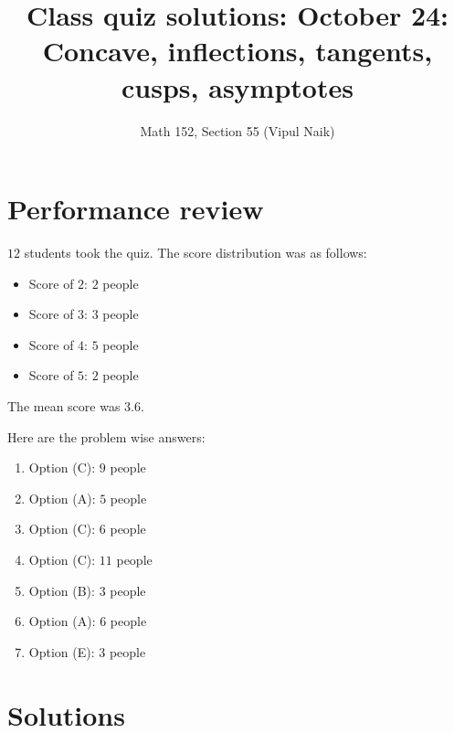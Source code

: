\documentclass[10pt]{amsart}
\title{Class quiz solutions: October 24: Concave, inflections, tangents, cusps, asymptotes}
\author{Math 152, Section 55 (Vipul Naik)}
\begin{document}
\maketitle

\section{Performance review}

$12$ students took the quiz. The score distribution was as follows:

\begin{itemize}
\item Score of $2$: $2$ people
\item Score of $3$: $3$ people
\item Score of $4$: $5$ people
\item Score of $5$: $2$ people
\end{itemize}

The mean score was $3.6$.

Here are the problem wise answers:

\begin{enumerate}
\item Option (C): $9$ people
\item Option (A): $5$ people
\item Option (C): $6$ people
\item Option (C): $11$ people
\item Option (B): $3$ people
\item Option (A): $6$ people
\item Option (E): $3$ people
\end{enumerate}

\section{Solutions}
\end{document}
